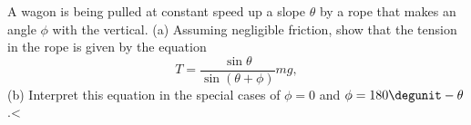         A wagon is being pulled at constant speed up a slope $\theta$
        by a rope that makes an angle $\phi$ with the vertical. (a)
        Assuming negligible friction, show that the tension in the
        rope is given by the equation
        \begin{equation*}
                T = \frac{\sin\theta}{\sin(\theta+\phi)}mg,
        \end{equation*}\hwendpart
        (b)
        Interpret this equation in the special cases of $\phi=0$ and
        $\phi=180\degunit-\theta$.<%
